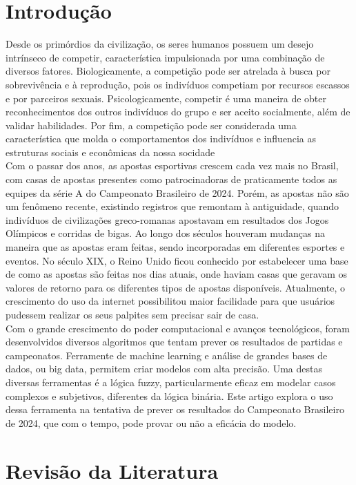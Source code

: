 \documentclass[conference]{IEEEtran}
\begin{document}
\section{Introdução}
\indent Desde os primórdios da civilização, os seres humanos possuem um desejo 
intrínseco de competir, característica impulsionada por uma combinação de
diversos fatores. Biologicamente, a competição pode ser atrelada à busca por 
sobrevivência e à reprodução, pois os indivíduos competiam por recursos 
escassos e por parceiros sexuais. Psicologicamente, competir é uma maneira de 
obter reconhecimentos dos outros indivíduos do grupo e ser aceito socialmente, 
além de validar habilidades. Por fim, a competição pode ser considerada uma 
característica que molda o comportamentos dos indivíduos e influencia as 
estruturas sociais e econômicas da nossa socidade \\
\indent Com o passar dos anos, as apostas esportivas crescem cada vez mais no 
Brasil, com casas de apostas presentes como patrocinadoras de praticamente 
todos as equipes da série A do Campeonato Brasileiro de 2024. Porém, as apostas 
não são um fenômeno recente, existindo registros que remontam à antiguidade, 
quando indivíduos de civilizações greco-romanas apostavam em resultados dos 
Jogos Olímpicos e corridas de bigas. Ao longo dos séculos houveram mudanças na 
maneira que as apostas eram feitas, sendo incorporadas em diferentes esportes e 
eventos. No século XIX, o Reino Unido ficou conhecido por estabelecer uma base 
de como as apostas são feitas nos dias atuais, onde haviam casas que geravam os 
valores de retorno para os diferentes tipos de apostas disponíveis. Atualmente, 
o crescimento do uso da internet possibilitou maior facilidade para que usuários 
pudessem realizar os seus palpites sem precisar sair de casa.\\
\indent Com o grande crescimento do poder computacional e avanços tecnológicos, 
foram desenvolvidos diversos algoritmos que tentam prever os resultados de 
partidas e campeonatos. Ferramente de machine learning e análise de grandes 
bases de dados, ou big data, permitem criar modelos com alta precisão. Uma 
destas diversas ferramentas é a lógica fuzzy, particularmente eficaz em modelar 
casos complexos e subjetivos, diferentes da lógica binária. Este artigo explora 
o uso dessa ferramenta na tentativa de prever os resultados do Campeonato 
Brasileiro de 2024, que com o tempo, pode provar ou não a eficácia do modelo.

\section{Revisão da Literatura}
\end{document}
